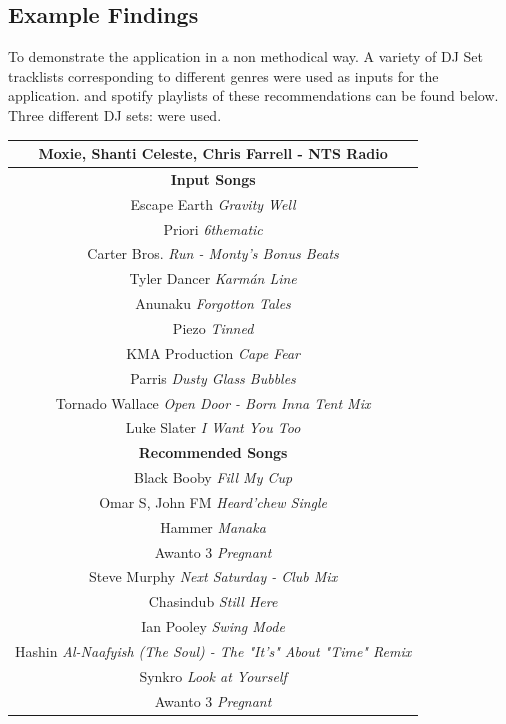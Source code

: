 \subsection{Example Findings}
To demonstrate the application in a non methodical way. A variety of DJ Set tracklists corresponding to different genres were used as inputs for the application. and spotify playlists of these recommendations can be found below.  Three different DJ sets: were used.

\begin{center}
	\begin{tabular}{ |c|} 
		\hline
		Moxie, Shanti Celeste, Chris Farrell - NTS Radio\\ 
		\hline \textbf{Input Songs}\\ 
		\hline Escape Earth \textit{Gravity Well} \\ 
		\hline Priori \textit{6thematic }\\
		\hline Carter Bros. \textit{Run - Monty's Bonus Beats}\\
		\hline Tyler Dancer \textit{Karmán Line}\\ 
		\hline Anunaku \textit{Forgotton Tales}\\
		\hline Piezo \textit{Tinned}\\
		\hline KMA Production \textit{Cape Fear}\\
		\hline Parris \textit{Dusty Glass Bubbles}\\
		\hline Tornado Wallace \textit{Open Door - Born Inna Tent Mix}\\
		\hline Luke Slater \textit{I Want You Too}\\
		\hline \textbf{Recommended Songs}\\ 
		\hline Black Booby \textit{Fill My Cup}\\
		\hline Omar S, John FM \textit{Heard'chew Single}\\
		\hline Hammer \textit{Manaka}\\
		\hline Awanto 3 \textit{Pregnant}\\
		\hline Steve Murphy \textit{Next Saturday - Club Mix}\\
		\hline Chasindub \textit{Still Here}\\
		\hline Ian Pooley \textit{Swing Mode}\\
		\hline Hashin \textit{Al-Naafyish (The Soul) - The "It's" About "Time" Remix}\\
		\hline Synkro \textit{Look at Yourself}\\
		\hline Awanto 3 \textit{Pregnant}\\
		\hline
	\end{tabular}
\end{center}

